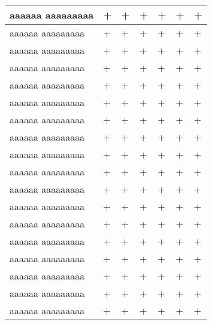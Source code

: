 \documentclass[12pt]{article}
\begin{document}
\begin{longtable}{|m{}|R{0.08\textwidth}|R{0.08\textwidth}|R{0.08\textwidth}|R{0.08\textwidth}|R{0.08\textwidth}|R{0.08\textwidth}|}
    \endfoot
    aaaaaa \newline aaaaaaaaa & + & + & + & + & + & + \\ \hline
    aaaaaa \newline aaaaaaaaa & + & + & + & + & + & + \\ \hline
    aaaaaa \newline aaaaaaaaa & + & + & + & + & + & + \\ \hline
    aaaaaa \newline aaaaaaaaa & + & + & + & + & + & + \\ \hline
    aaaaaa \newline aaaaaaaaa & + & + & + & + & + & + \\ \hline
    aaaaaa \newline aaaaaaaaa & + & + & + & + & + & + \\ \hline
    aaaaaa \newline aaaaaaaaa & + & + & + & + & + & + \\ \hline
    aaaaaa \newline aaaaaaaaa & + & + & + & + & + & + \\ \hline
    aaaaaa \newline aaaaaaaaa & + & + & + & + & + & + \\ \hline
    aaaaaa \newline aaaaaaaaa & + & + & + & + & + & + \\ \hline
    aaaaaa \newline aaaaaaaaa & + & + & + & + & + & + \\ \hline
    aaaaaa \newline aaaaaaaaa & + & + & + & + & + & + \\ \hline
    aaaaaa \newline aaaaaaaaa & + & + & + & + & + & + \\ \hline
    aaaaaa \newline aaaaaaaaa & + & + & + & + & + & + \\ \hline
    aaaaaa \newline aaaaaaaaa & + & + & + & + & + & + \\ \hline
    aaaaaa \newline aaaaaaaaa & + & + & + & + & + & + \\ \hline
    aaaaaa \newline aaaaaaaaa & + & + & + & + & + & + \\ \hline
    aaaaaa \newline aaaaaaaaa & + & + & + & + & + & + \\ \hline

\end{longtable}
\end{document}
